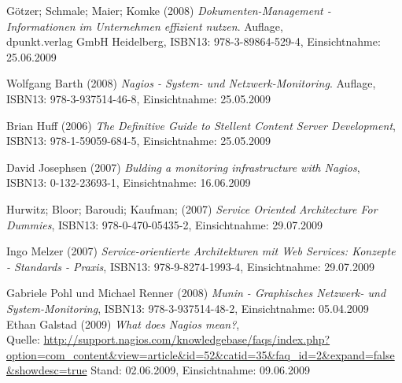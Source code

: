 \documentclass[12pt, a4paper, headsepline]{article}
\newcommand{\pictext}[1]{\glqq\textit{#1}\grqq }
\begin{document}

\begin{thebibliography}{xxxxxxxxxxx}

	 Götzer; Schmale; Maier; Komke (2008) \pictext{Dokumenten-Management - Informationen im Unternehmen effizient nutzen} 4. Auflage,\\
	 dpunkt.verlag GmbH Heidelberg,  
	 ISBN13: 978-3-89864-529-4, Einsichtnahme: 25.06.2009

	 Wolfgang Barth (2008) \pictext{Nagios - System- und Netzwerk-Monitoring} 2. Auflage, \\
	 ISBN13: 978-3-937514-46-8, Einsichtnahme: 25.05.2009
	 
	 Brian Huff (2006) \pictext{The Definitive Guide to Stellent Content Server Development}, \newline ISBN13: 978-1-59059-684-5, Einsichtnahme: 25.05.2009

	 David Josephsen (2007) \pictext{Bulding a monitoring infrastructure with Nagios}, \newline ISBN13: 0-132-23693-1, Einsichtnahme: 16.06.2009

	 Hurwitz; Bloor; Baroudi; Kaufman; (2007) \pictext{Service Oriented Architecture For Dummies}, \newline ISBN13: 978-0-470-05435-2, Einsichtnahme: 29.07.2009
	 
		 Ingo Melzer (2007) \pictext{Service-orientierte Architekturen mit Web Services: Konzepte - Standards - Praxis}, \newline ISBN13: 978-9-8274-1993-4, Einsichtnahme: 29.07.2009	 
		 
		 	  Gabriele Pohl und Michael Renner (2008) 
	 \pictext{Munin - Graphisches Netzwerk- und System-Monitoring}, \newline ISBN13: 978-3-937514-48-2, Einsichtnahme: 05.04.2009\\	
	 	
 		 	 	  Ethan Galstad (2009) \pictext{What does Nagios mean?}, \\ Quelle: \url{http://support.nagios.com/knowledgebase/faqs/index.php?option=com\_content&view=article&id=52&catid=35&faq\_id=2&expand=false&showdesc=true} \newline Stand: 02.06.2009, Einsichtnahme: 09.06.2009 	 
	 

\end{thebibliography}
\end{document}
